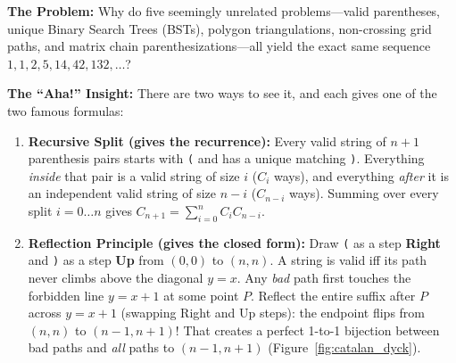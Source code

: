\documentclass[11pt,a4paper]{article}
\theoremstyle{definition}
\newcommand{\painbeat}{\textbf{\color{accentamber}The Problem:} }
\newcommand{\ahabeat}{\textbf{\color{accentteal}The ``Aha!'' Insight:} }
\begin{document}
\painbeat Why do five seemingly unrelated problems---valid parentheses, unique Binary Search Trees (BSTs), polygon triangulations, non-crossing grid paths, and matrix chain parenthesizations---all yield the exact same sequence $1, 1, 2, 5, 14, 42, 132, \dots$?

\ahabeat There are two ways to see it, and each gives one of the two famous formulas:
\begin{enumerate}
    \item \textbf{Recursive Split (gives the recurrence):} Every valid string of $n + 1$ parenthesis pairs starts with \texttt{(} and has a unique matching \texttt{)}. Everything \emph{inside} that pair is a valid string of size $i$ ($C_i$ ways), and everything \emph{after} it is an independent valid string of size $n - i$ ($C_{n-i}$ ways). Summing over every split $i = 0 \dots n$ gives $C_{n+1} = \sum_{i=0}^{n} C_i C_{n-i}$.
    \item \textbf{Reflection Principle (gives the closed form):} Draw \texttt{(} as a step \textbf{Right} and \texttt{)} as a step \textbf{Up} from $(0,0)$ to $(n,n)$. A string is valid iff its path never climbs above the diagonal $y = x$. Any \emph{bad} path first touches the forbidden line $y = x + 1$ at some point $P$. Reflect the entire suffix after $P$ across $y = x + 1$ (swapping Right and Up steps): the endpoint flips from $(n, n)$ to $(n - 1, n + 1)$! That creates a perfect 1-to-1 bijection between bad paths and \emph{all} paths to $(n - 1, n + 1)$ (Figure~\ref{fig:catalan_dyck}).
\end{enumerate}
\end{document}

